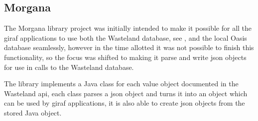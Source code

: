 \subsection{Morgana}
\label{sub:morgana:intro}
The Morgana library project was initially intended to make it possible for all the \ac{giraf} applications to use both the Wasteland database, see , and the local Oasis database seamlessly, however in the time allotted it was not possible to finish this functionality, so the focus was shifted to making it parse and write \ac{json} objects for use in calls to the Wasteland database.

The library implements a Java class for each value object documented in the Wasteland \ac{api}, each class parses a \ac{json} object and turns it into an object which can be used by \ac{giraf} applications, it is also able to create \ac{json} objects from the stored Java object.
